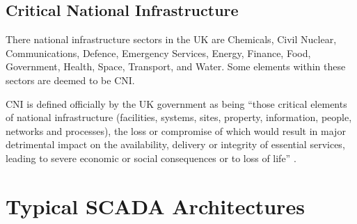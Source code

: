 \documentclass[12pt]{article}
\begin{document}
\subsection{Critical National Infrastructure}
There national infrastructure sectors in the UK are Chemicals, Civil Nuclear, Communications, Defence, Emergency Services, Energy, Finance, Food, Government, Health, Space, Transport, and Water. Some elements within these sectors are deemed to be CNI.

CNI is defined officially by the UK government as being ``those critical elements of national infrastructure (facilities, systems, sites, property, information, people, networks and processes), the loss or compromise of which would result in major detrimental impact on the availability, delivery or integrity of essential services, leading to severe economic or social consequences or to loss of life'' \citep{site:cpni:cni}.

\pagebreak
\section{Typical SCADA Architectures}
\end{document}
